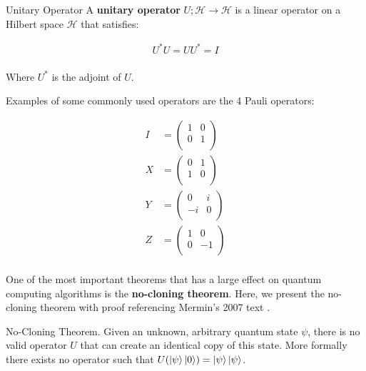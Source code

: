 \begin{definition}{Unitary Operator}
    A \textbf{unitary operator} $U;\mathcal{H} \to \mathcal{H}$ is a linear operator on a Hilbert space $\mathcal{H}$ that satisfies:
    
    \begin{align*}
        U^*U = UU^* = I \\ 
    \end{align*}
    
    Where $U^*$ is the adjoint of $U$.
\end{definition}

Examples of some commonly used operators are the 4 Pauli operators:

\begin{align*}
    I &= \begin{pmatrix}
        1 & 0 \\ 
        0 & 1 \\ 
    \end{pmatrix} \\ 
    X &= \begin{pmatrix}
        0 & 1 \\ 
        1 & 0 \\ 
    \end{pmatrix} \\ 
    Y &= \begin{pmatrix}
        0 & i \\ 
        -i & 0 \\ 
    \end{pmatrix} \\ 
    Z &= \begin{pmatrix}
        1 & 0 \\ 
        0 & -1 \\ 
    \end{pmatrix} \\ 
\end{align*}

One of the most important theorems that has a large effect on quantum computing algorithms is the \textbf{no-cloning theorem}. Here, we present the no-cloning theorem with proof referencing Mermin's 2007 text \cite{merlin}.

\begin{theorem}{No-Cloning Theorem.}
    \label{thm:no-cloning-thm}
    Given an unknown, arbitrary quantum state $\psi$, there is no valid operator $U$ that can create an identical copy of this state. More formally there exists no operator such that $U(\ket{\psi} \ket{0}) = \ket{\psi}\ket{\psi}$.
\end{theorem}


